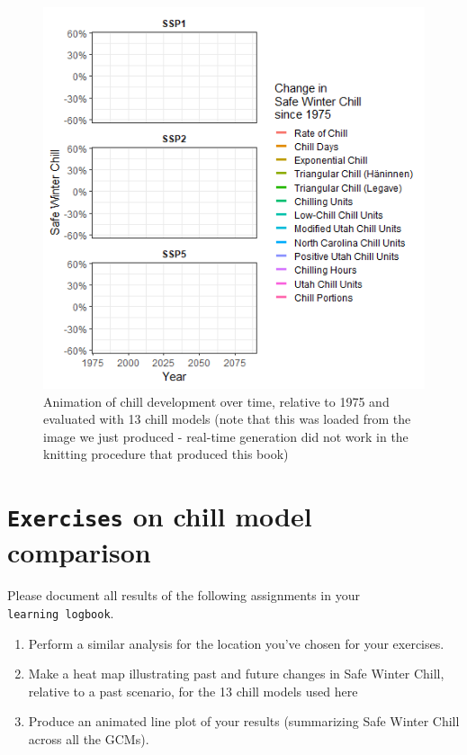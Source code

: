 \documentclass[
]{book}
\providecommand{\tightlist}{%
  \setlength{\itemsep}{0pt}\setlength{\parskip}{0pt}}
\begin{document}
\begin{figure}
\centering
\includegraphics{data/chill_comparison_animation.gif}
\caption{Animation of chill development over time, relative to 1975 and evaluated with 13 chill models (note that this was loaded from the image we just produced - real-time generation did not work in the knitting procedure that produced this book)}
\end{figure}

\hypertarget{exercises_chill_model_comparison}{%
\section*{\texorpdfstring{\texttt{Exercises} on chill model comparison}{Exercises on chill model comparison}}\label{exercises_chill_model_comparison}}

Please document all results of the following assignments in your \texttt{learning\ logbook}.

\begin{enumerate}
\def\labelenumi{\arabic{enumi})}
\tightlist
\item
  Perform a similar analysis for the location you've chosen for your exercises.
\item
  Make a heat map illustrating past and future changes in Safe Winter Chill, relative to a past scenario, for the 13 chill models used here
\item
  Produce an animated line plot of your results (summarizing Safe Winter Chill across all the GCMs).
\end{enumerate}
\end{document}
